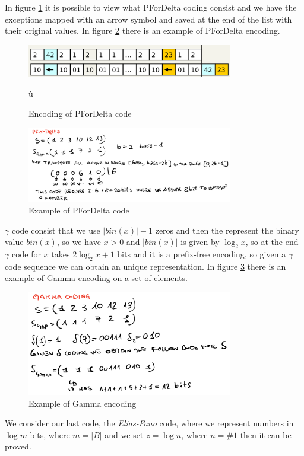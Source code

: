 In figure \ref{img:pfDelta} it is possible to view what PForDelta coding
consist and we have the exceptions mapped with an arrow symbol and 
saved at the end of the list with their original values.\newline
In figure \ref{img:pfDeltaEx} there is an example of PForDelta encoding.

\begin{figure}
	\includegraphics[width=0.8\textwidth]{Images/pfDelta}
	\caption{Encoding of PForDelta code}
	\label{img:pfDelta}ù
\end{figure}
\begin{figure}
	\includegraphics[width=0.8\textwidth]{Images/PForDelta}
	\caption{Example of PForDelta code}
	\label{img:pfDeltaEx}
\end{figure}
$\gamma$ code consist that we use $|bin(x)| - 1$ zeros and then the 
represent the binary value $bin(x)$, so we have $x > 0$ and $|bin(x)|$ is 
given by $\log_2 x$, so at the end $\gamma$ code for $x$ takes
$2 \log_2 x + 1$ bits and it is a prefix-free encoding, so given a 
$\gamma$ code sequence we can obtain an unique representation.\newline
In figure \ref{img:gamma} there is an example of Gamma encoding on a set of elements.

\begin{figure}
	\includegraphics[width=0.8\textwidth]{Images/gammaEx}
	\caption{Example of Gamma encoding}
	\label{img:gamma}
\end{figure}
We consider our last code, the \emph{Elias-Fano} code, where we represent
numbers in $\log m$ bits, where $m = |B|$ and we set $z = \log n$,
where $n = \# 1$ then it can be proved.

